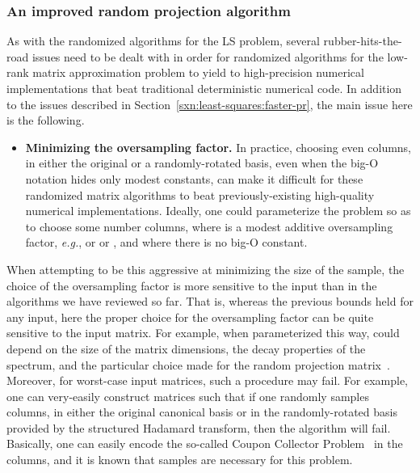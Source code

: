 \documentclass[twoside]{article}
\begin{document}
\subsubsection{An improved random projection algorithm}
\label{sxn:low-rank:proj-second}

As with the randomized algorithms for the LS problem, several 
rubber-hits-the-road issues need to be dealt with in order for randomized 
algorithms for the low-rank matrix approximation problem to yield to 
high-precision numerical implementations that beat traditional deterministic
numerical code.
In addition to the issues described in 
Section~\ref{sxn:least-squares:faster-pr}, the main issue here is the 
following.
\begin{itemize}
\item
\textbf{Minimizing the oversampling factor.}
In practice, choosing even  columns, in either the original or 
a randomly-rotated basis, even when the big-O notation hides only modest 
constants, can make it difficult for these randomized matrix algorithms to 
beat previously-existing high-quality numerical implementations.
Ideally, one could parameterize the problem so as to choose some number 
 columns, where  is a modest additive oversampling factor, 
\emph{e.g.},  or  or , and where there is no big-O constant.
\end{itemize}
When attempting to be this aggressive at minimizing the size of the sample, 
the choice of the oversampling factor  is more sensitive to the input
than in the algorithms we have reviewed so far.
That is, whereas the previous bounds held for any input, here the proper 
choice for the oversampling factor  can be quite sensitive to the input
matrix.
For example, when parameterized this way,  could depend on the size of 
the matrix dimensions, the decay properties of the spectrum, and the 
particular choice made for the 
random projection matrix~\cite{MRT11,WLRT08,LWFMRT07,RST09,HMT09_SIREV,HMST10_TR}.
Moreover, for worst-case input matrices, such a procedure may fail.
For example, one can very-easily construct matrices such that if one randomly 
samples  columns, in either the original canonical basis or in 
the randomly-rotated basis provided by the structured Hadamard transform, 
then the algorithm will fail.
Basically, one can easily encode the so-called Coupon 
Collector Problem~\cite{MotwaniRaghavan95} in the columns, and it is known 
that  samples are necessary for this problem.
\end{document}
